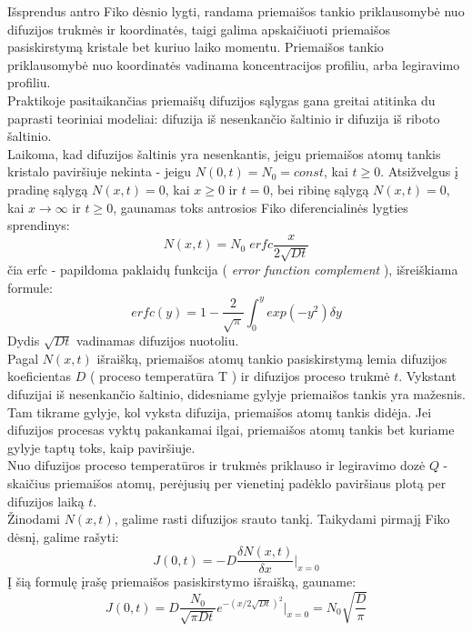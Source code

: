 \documentclass[11pt,a4paper]{article}
\begin{document}
Išsprendus antro Fiko dėsnio lygti, randama priemaišos tankio priklausomybė nuo difuzijos trukmės ir koordinatės, 
taigi galima apskaičiuoti priemaišos pasiskirstymą kristale bet kuriuo laiko momentu. 
Priemaišos tankio priklausomybė nuo koordinatės vadinama koncentracijos profiliu, arba legiravimo profiliu.\\
Praktikoje pasitaikančias priemaišų difuzijos sąlygas gana greitai atitinka du paprasti teoriniai modeliai: difuzija iš nesenkančio šaltinio ir difuzija iš riboto šaltinio.\\
Laikoma, kad difuzijos šaltinis yra nesenkantis, jeigu priemaišos atomų tankis kristalo paviršiuje nekinta - jeigu $N(0,t) = N_0 = const$, 
kai $t \geq 0$. Atsižvelgus į pradinę sąlygą $N(x,t) = 0$, kai $x \geq 0 $ ir $t=0$, bei ribinę sąlygą $N(x,t)=0$, 
kai $x \rightarrow \infty$ ir $t \geq 0$, gaunamas toks antrosios Fiko diferencialinės lygties sprendinys:
\begin{equation}
N(x,t) = N_0\;erfc\frac{x}{2\sqrt{Dt}}
\end{equation}
čia erfc - papildoma paklaidų funkcija ( \emph{error function complement} ), išreiškiama formule:
\begin{equation}
erfc(y) = 1 - \frac{2}{\sqrt{\pi}} \int^y_0 exp(-y^2) \delta y
\end{equation}
Dydis $\sqrt{Dt}$ vadinamas difuzijos nuotoliu.\\
Pagal $N(x,t)$ išraišką, priemaišos atomų tankio pasiskirstymą lemia difuzijos koeficientas $D$ ( proceso temperatūra T ) ir difuzijos proceso trukmė $t$. Vykstant difuzijai iš nesenkančio šaltinio, didesniame gylyje priemaišos tankis yra mažesnis. Tam tikrame gylyje, kol vyksta difuzija, priemaišos atomų tankis didėja. Jei difuzijos procesas vyktų pakankamai ilgai, priemaišos atomų tankis bet kuriame gylyje taptų toks, kaip paviršiuje.\\
Nuo difuzijos proceso temperatūros ir trukmės priklauso ir legiravimo dozė $Q$ -  skaičius priemaišos atomų, perėjusių per vienetinį padėklo paviršiaus plotą per difuzijos laiką $t$.\\
Žinodami $N(x,t)$, galime rasti difuzijos srauto tankį. Taikydami pirmajį Fiko dėsnį, galime rašyti:
\begin{equation} 
J(0,t) = - D\frac{\delta N(x,t)}{\delta x}|_{x=0}
\end{equation}
Į šią formulę įrašę priemaišos pasiskirstymo išraišką, gauname:
\begin{equation}
J(0,t) = D\frac{N_0}{\sqrt{\pi Dt}} e^{-(x/2\sqrt{Dt})^{2}}|_{x=0} = N_0 \sqrt{\frac{D}{\pi}}
\end{equation}
\end{document}
